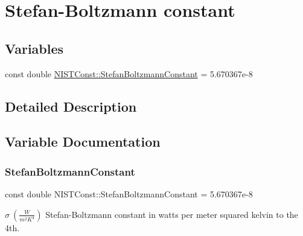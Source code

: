 \hypertarget{group___n_i_s_t_const-_stefan_boltzmann_constant}{}\section{Stefan-\/\+Boltzmann constant}
\label{group___n_i_s_t_const-_stefan_boltzmann_constant}
\subsection*{Variables}
\begin{DoxyCompactItemize}
\item 
const double \mbox{\hyperlink{group___n_i_s_t_const-_stefan_boltzmann_constant_ga1094e420290686333202d186399d706d}{N\+I\+S\+T\+Const\+::\+Stefan\+Boltzmann\+Constant}} = 5.\+670367e-\/8
\end{DoxyCompactItemize}


\subsection{Detailed Description}


\subsection{Variable Documentation}
\mbox{\label{group___n_i_s_t_const-_stefan_boltzmann_constant_ga1094e420290686333202d186399d706d}} 
\subsubsection{\texorpdfstring{Stefan\+Boltzmann\+Constant}{StefanBoltzmannConstant}}
{\footnotesize\ttfamily const double N\+I\+S\+T\+Const\+::\+Stefan\+Boltzmann\+Constant = 5.\+670367e-\/8}

$\sigma \ (\frac{W}{m^2 K^4})$ Stefan-\/\+Boltzmann constant in watts per meter squared kelvin to the 4th. 